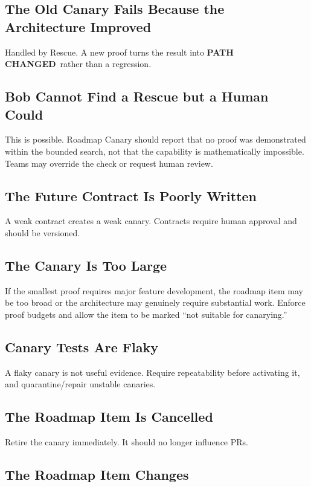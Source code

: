 \documentclass[12pt]{article}
\newcommand{\statuschanged}{\textbf{\color{amber}PATH CHANGED}}
\begin{document}
\subsection{The Old Canary Fails Because the Architecture Improved}

Handled by Rescue. A new proof turns the result into \statuschanged\ rather than a regression.

\subsection{Bob Cannot Find a Rescue but a Human Could}

This is possible. Roadmap Canary should report that no proof was demonstrated within the bounded search, not that the capability is mathematically impossible. Teams may override the check or request human review.

\subsection{The Future Contract Is Poorly Written}

A weak contract creates a weak canary. Contracts require human approval and should be versioned.

\subsection{The Canary Is Too Large}

If the smallest proof requires major feature development, the roadmap item may be too broad or the architecture may genuinely require substantial work. Enforce proof budgets and allow the item to be marked ``not suitable for canarying.''

\subsection{Canary Tests Are Flaky}

A flaky canary is not useful evidence. Require repeatability before activating it, and quarantine/repair unstable canaries.

\subsection{The Roadmap Item Is Cancelled}

Retire the canary immediately. It should no longer influence PRs.

\subsection{The Roadmap Item Changes}
\end{document}
